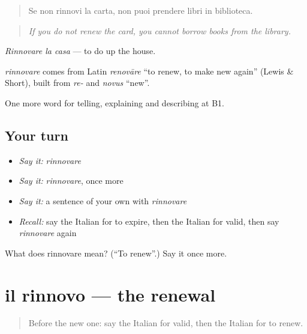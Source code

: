 \begin{quote}
Se non rinnovi la carta, non puoi prendere libri in biblioteca.
\end{quote}

\begin{quote}
\emph{If you do not renew the card, you cannot borrow books from the library.}
\end{quote}

\emph{Rinnovare la casa} — to do up the house.

\begin{cousinweb}
\emph{rinnovare} comes from Latin \emph{renovāre} \textquotedblleft{}to renew, to make new again\textquotedblright{} (Lewis \& Short), built from \emph{re-} and \emph{novus} \textquotedblleft{}new\textquotedblright{}.
\end{cousinweb}

\begin{grammarlens}[title={What you've built}]
One more word for telling, explaining and describing at B1.
\end{grammarlens}

\subsection*{Your turn}
\begin{itemize}
\raggedright
  \item \emph{Say it:} \emph{rinnovare}
  \item \emph{Say it:} \emph{rinnovare}, once more
  \item \emph{Say it:} a sentence of your own with \emph{rinnovare}
  \item \emph{Recall:} say the Italian for to expire, then the Italian for valid, then say \emph{rinnovare} again
\end{itemize}

\begin{tcolorbox}[breakable,colback=teal!4,colframe=teal!35!black,title={Before you move on}]
What does rinnovare mean? (\textquotedblleft{}To renew\textquotedblright{}.) Say it once more.
\end{tcolorbox}
\section[il rinnovo]{il rinnovo — the renewal}

\label{lesson:IT-C388-rinnovo}



\begin{quote}
Before the new one: say the Italian for valid, then the Italian for to renew.
\end{quote}

